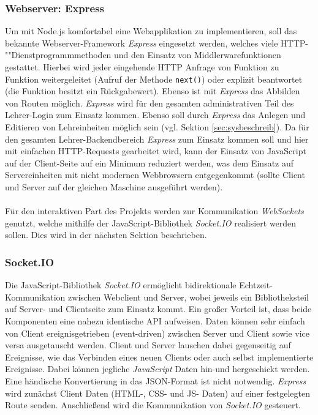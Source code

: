 \subsubsection{Webserver: Express}\label{sec:expressjs}
Um mit Node.js komfortabel eine Webapplikation zu implementieren, soll das bekannte Webserver-Framework \emph{Express} eingesetzt werden, welches viele HTTP-""Dienstprogrammmethoden und den Einsatz von Middlerwarefunktionen gestattet. Hierbei wird jeder eingehende HTTP Anfrage von Funktion zu Funktion weitergeleitet (Aufruf der Methode \texttt{next()}) oder explizit beantwortet (die Funktion besitzt ein Rückgabewert). Ebenso ist mit \emph{Express} das Abbilden von Routen möglich. \emph{Express} wird für den gesamten administrativen Teil des Lehrer-Login zum Einsatz kommen. Ebenso soll durch \emph{Express} das Anlegen und Editieren von Lehreinheiten möglich sein (vgl. Sektion \ref{sec:sysbeschreib}). 
Da für den gesamten Lehrer-Backendbereich \emph{Express} zum Einsatz kommen soll und hier mit einfachen HTTP-Requests gearbeitet wird, kann der Einsatz von JavaScript auf der Client-Seite auf ein Minimum reduziert werden, was dem Einsatz auf Servereinheiten mit nicht modernen Webbrowsern entgegenkommt (sollte Client und Server auf der gleichen Maschine ausgeführt werden).\\ \\ 
Für den interaktiven Part des Projekts werden zur Kommunikation \emph{WebSockets} genutzt, welche mithilfe der JavaScript-Bibliothek \emph{Socket.IO} realisiert werden sollen. Dies wird in der nächsten Sektion beschrieben.   

\subsubsection{Socket.IO}\label{sec:socketio}
Die JavaScript-Bibliothek \emph{Socket.IO} \cite{Socket.IO2019} ermöglicht bidirektionale Echtzeit-\\Kommunikation zwischen Webclient und Server, wobei jeweils ein Bibliotheksteil auf Server- und Clientseite zum Einsatz kommt. Ein großer Vorteil ist, dass beide Komponenten eine nahezu identische API aufweisen. Daten können sehr einfach von Client ereignisgetrieben (event-driven) zwischen Server und Client sowie vice versa ausgetauscht werden. Client und Server lauschen dabei gegenseitig auf Ereignisse, wie das Verbinden eines neuen Clients oder auch selbst implementierte Ereignisse. Dabei können jegliche \emph{JavaScript} Daten hin-und hergeschickt werden. Eine händische Konvertierung in das JSON-Format ist nicht notwendig. \emph{Express} wird zunächst Client Daten (HTML-, CSS- und JS- Daten) auf einer festgelegten Route senden. Anschließend wird die Kommunikation von \emph{Socket.IO} gesteuert. 
